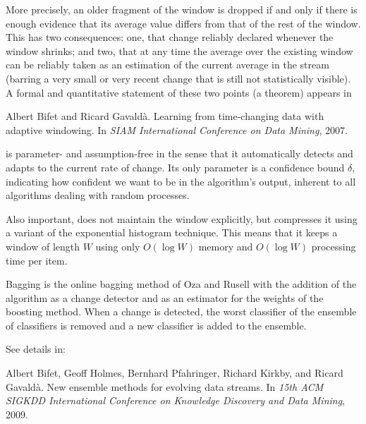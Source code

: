 \documentclass[a4paper,12pt,twoside]{book}
\begin{document}
More precisely, an older fragment of the window is dropped if and only if 
there is enough evidence that its average value differs from that of 
the rest of the window. 
This has two consequences: one, that change reliably declared whenever
the window shrinks; and two, that at any time the average over the existing
window can be reliably taken as an estimation of the current average in the stream
(barring a very small or very recent change that is still not statistically 
visible). A formal and quantitative statement of these two points (a theorem)
appears in 

\begin{itemize}
Albert Bifet and Ricard Gavald{\`a}.
\newblock Learning from time-changing data with adaptive windowing.
\newblock In {\em SIAM International Conference on Data Mining}, 2007.\end{itemize}


\adwin is parameter- and assumption-free in the sense that 
it automatically detects and adapts to the current rate of change. 
Its only parameter is a confidence bound $\delta$,
indicating how confident we want to be in the algorithm's output, 
inherent to all algorithms dealing with random processes. 

Also important, \adwin does not maintain the window
explicitly, but compresses it using a variant of the exponential histogram
technique. %
This means that it keeps a window of length $W$
using only $O(\log W)$ memory and $O(\log W)$ processing time per item. %

\adwin Bagging is the online bagging method of Oza and Rusell
with the  addition of the \adwin algorithm as a change 
detector and as an estimator for the weights of the boosting method.
When a change is detected, the worst classifier of the ensemble of classifiers 
is removed and a new classifier is added to the ensemble.


See details in:

\begin{itemize}
Albert Bifet, Geoff Holmes, Bernhard Pfahringer, Richard Kirkby, and Ricard
  Gavald\`a.
\newblock New ensemble methods for evolving data streams.
\newblock In {\em 15th ACM SIGKDD International Conference on Knowledge
  Discovery and Data Mining}, 2009.
\end{itemize}
\end{document}
